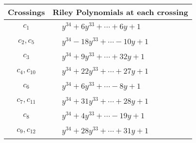 \documentclass[1p]{elsarticle_modified}
\theoremstyle{definition}
\begin{document}
\begin{tabular}{m{50pt}|m{274pt}}
Crossings & \hspace{64pt}Riley Polynomials at each crossing \\
\hline $$\begin{aligned}c_{1}\end{aligned}$$&$\begin{aligned}
&y^{34}+6 y^{33}+\cdots+6 y+1
\end{aligned}$\\
\hline $$\begin{aligned}c_{2},c_{5}\end{aligned}$$&$\begin{aligned}
&y^{34}-18 y^{33}+\cdots-10 y+1
\end{aligned}$\\
\hline $$\begin{aligned}c_{3}\end{aligned}$$&$\begin{aligned}
&y^{34}+9 y^{33}+\cdots+32 y+1
\end{aligned}$\\
\hline $$\begin{aligned}c_{4},c_{10}\end{aligned}$$&$\begin{aligned}
&y^{34}+22 y^{33}+\cdots+27 y+1
\end{aligned}$\\
\hline $$\begin{aligned}c_{6}\end{aligned}$$&$\begin{aligned}
&y^{34}+6 y^{33}+\cdots-8 y+1
\end{aligned}$\\
\hline $$\begin{aligned}c_{7},c_{11}\end{aligned}$$&$\begin{aligned}
&y^{34}+31 y^{33}+\cdots+28 y+1
\end{aligned}$\\
\hline $$\begin{aligned}c_{8}\end{aligned}$$&$\begin{aligned}
&y^{34}+4 y^{33}+\cdots-19 y+1
\end{aligned}$\\
\hline $$\begin{aligned}c_{9},c_{12}\end{aligned}$$&$\begin{aligned}
&y^{34}+28 y^{33}+\cdots+31 y+1
\end{aligned}$\\
\hline
\end{tabular}\\~\\
\end{document}

